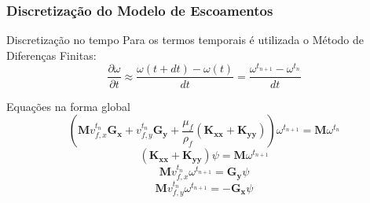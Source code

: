\documentclass{beamer}
\begin{document}
\begin{frame}
  \frametitle{Discretização do Modelo de Escoamentos}
  
  \begin{block}{Discretização no tempo}
    Para os termos temporais é utilizada o Método de Diferenças Finitas:
    \begin{equation*}
      \dfrac{\partial \omega}{\partial t} \approx
      \frac{
	  \omega(t + dt) -
	  \omega(t)
      }{dt}
      =
      \frac{
	  \omega^{t_{n+1}} -
	  \omega^{t_{n}}
      }{dt}
    \end{equation*}
  \end{block}
  
  \begin{block}{Equações na forma global}
    \begin{equation*}
      \left(
	  \mathbf{M} v_{f,x}^{t_{n}} \mathbf{G_x} + v_{f,y}^{t_{n}} \mathbf{G_y} + \dfrac{\mu_f}{\rho_f}
	  \left( \mathbf{K_{xx}} + \mathbf{K_{yy}} \right)
      \right)
      \omega^{t_{n+1}} = \mathbf{M} \omega^{t_{n}}
      \label{last_w}
    \end{equation*}
    \begin{equation*}
      \left( \mathbf{K_{xx}} + \mathbf{K_{yy}} \right)
      \psi = \mathbf{M} \omega^{t_{n+1}}
      \label{last_psi}
    \end{equation*}
    \begin{equation*}
      \mathbf{M} v_{f,x}^{t_{n}} \omega^{t_{n+1}} =
      \mathbf{G_y} \psi
      \label{last_vx}
    \end{equation*}
    \begin{equation*}
      \mathbf{M} v_{f,y}^{t_{n}} \omega^{t_{n+1}} = 
      -\mathbf{G_x} \psi
      \label{last_vy}
    \end{equation*}
  \end{block}
\end{frame}

\end{document}
